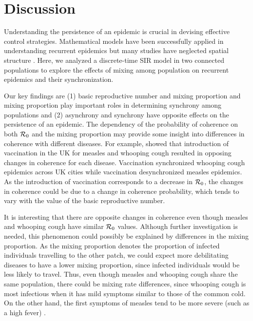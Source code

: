 \documentclass[12pt]{article}
\newcommand{\R}{{\cal R}}
\begin{document}
\section{Discussion}
\label{sec:discussion}

Understanding the persistence of an epidemic is crucial in devising effective control strategies.
Mathematical models have been successfully applied in understanding recurrent epidemics but many studies have neglected spatial structure \cite{earn2000simple, dalziel2016persistent}.
Here, we analyzed a discrete-time SIR model in two connected populations to explore the effects of mixing among population on recurrent epidemics and their synchronization.

Our key findings are (1) basic reproductive number and mixing proportion and mixing proportion play important roles in determining synchrony among populations and (2) asynchrony and synchrony have opposite effects on the persistence of an epidemic.
The dependency of the probability of coherence on both $\R_0$ and the mixing proportion may provide some insight into differences in coherence with different diseases. 
For example, \cite{rohani1999opposite} showed that introduction of vaccination in the UK for measles and whooping cough resulted in opposing changes in coherence for each disease. 
Vaccination synchronized whooping cough epidemics across UK cities while vaccination desynchronized measles epidemics. 
As the introduction of vaccination corresponds to a decrease in $\R_0$, the changes in coherence could be due to a change in coherence probability, which tends to vary with the value of the basic reproductive number. 

It is interesting that there are opposite changes in coherence even though measles and whooping cough have similar $\R_0$ values. 
Although further investigation is needed, this phenomenon could possibly be explained by differences in the mixing proportion. 
As the mixing proportion denotes the proportion of infected individuals travelling to the other patch, we could expect more debilitating diseases to have a lower mixing proportion, since infected individuals would be less likely to travel. Thus, even though measles and whooping cough share the same population, there could be mixing rate differences, since whooping cough is most infectious when it has mild symptoms similar to those of the common cold. On the other hand, the first symptoms of measles tend to be more severe (such as a high fever) \cite{CentersforDiseaseControlandPrevention2015, CentersforDiseaseControlandPrevention2017}.
\end{document}
